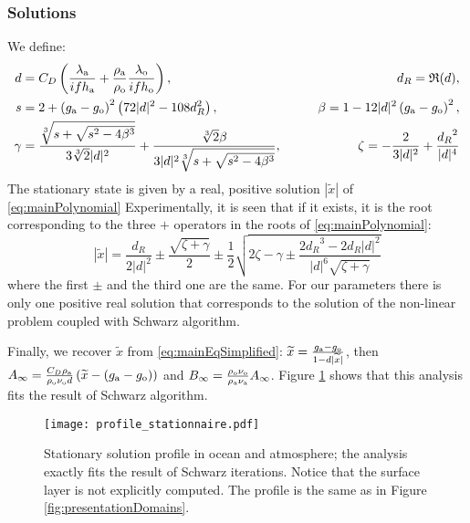 \subsubsection{Solutions}
\label{sec:summary_stationnary}
We define:
\begin{equation}
    \begin{aligned}
    {d} &= C_D\left(
    \frac{\lambda_{\rm a}}{if h_{\rm a}} 
    +\frac{\rho_{\rm a}}{\rho_{\rm o}}\frac{\lambda_{\rm o}}{if h_{\rm o}} \right), \qquad &d_R = \mathfrak{R}(d),
    \\
    s &= 2 + \left(g_{\rm a} - g_{\rm o}\right)^2 \left(72 |d|^2 - 108 d_R^2 \right),
    \qquad
    &\beta = 1 - 12 |d|^2 \left(g_{\rm a} - g_{\rm o}\right)^2, \\
    \gamma &= \frac{\sqrt[3]{s+\sqrt{s^2 - 4 \beta^3}}}{3\sqrt[3]{2}|d|^2} +\frac{\sqrt[3]{2}\beta}{3|d|^2 \sqrt[3]{s+\sqrt{s^2 - 4 \beta^3}}}, 
    \qquad &\zeta = -\frac{2}{3|d|^2} + \frac{{d_R}^2}{|d|^4}
    \end{aligned}
\end{equation}
The stationary state is given by a real, positive solution $|\widetilde{x}|$ of \eqref{eq:mainPolynomial}
Experimentally, it is seen that if it exists, it is the root corresponding to the three $+$ operators in the roots of \eqref{eq:mainPolynomial}:
\begin{equation}
    |\widetilde{x}| = \frac{{d_R}}{2|d|^2} \pm \frac{\sqrt{\zeta + \gamma }}{2} \pm \frac{1}{2}
    \sqrt{
    2\zeta - 
    \gamma
    \pm
    \frac{2{d_R}^3 - 2{d_R}|d|^2}{|d|^6 \sqrt{\zeta + \gamma }}
    }
\end{equation}
where the first $\pm$ and the
third one are the same. For our parameters there is only one positive real solution that corresponds to the solution of the non-linear problem coupled with Schwarz algorithm.
\par
Finally, we recover $\widetilde{x}$ from \eqref{eq:mainEqSimplified}: $\widetilde{x} = \frac{g_{\rm a} - g_{\rm o}}{1 - d |\widetilde{x}|}$, then $A_\infty = \frac{C_D \rho_{\rm a}}{\rho_{\rm o} \nu_{\rm o} d}\left(\widetilde{x} - (g_{\rm a} - g_{\rm o})\right)$ 
and
$ B_\infty =  \frac{\rho_{\rm o} \nu_{\rm o}}{\rho_{\rm a} \nu_{\rm a}}A_\infty$.
Figure \ref{fig:validation} shows that this analysis fits the result of Schwarz algorithm.
\begin{figure}
    \centering
    \texttt{[image: profile\_stationnaire.pdf]}
    \caption{Stationary solution profile in ocean and atmosphere;
	the analysis exactly fits the result of Schwarz iterations.
	Notice that the surface layer is not explicitly computed.
	The profile is the same as in Figure \ref{fig:presentationDomains}.}
    \label{fig:validation}
\end{figure}

